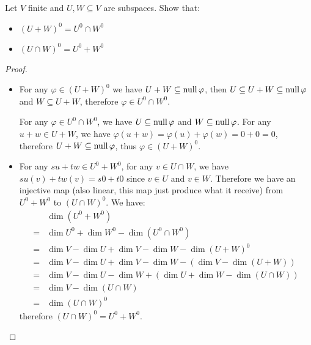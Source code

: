 \documentclass[../main.tex]{subfiles}
\begin{document}
\begin{exercise}
  Let $V$ finite and $U, W \subseteq V$ are subspaces. Show that:
  \begin{itemize}
    \item $(U + W)^0 = U^0 \cap W^0$
    \item $(U \cap W)^0 = U^0 + W^0$
  \end{itemize}
\end{exercise}
\begin{proof}
  ~
  \begin{itemize}
    \item For any $\varphi \in (U + W)^0$ we have $U + W \subseteq \operatorname{null} \varphi$, 
          then $U \subseteq U + W \subseteq \operatorname{null} \varphi$ and $W \subseteq U + W$,
          therefore $\varphi \in U^0 \cap W^0$.
          
          For any $\varphi \in U^0 \cap W^0$, we have $U \subseteq \operatorname{null} \varphi$ and $W \subseteq \operatorname{null} \varphi$.
          For any $u + w \in U + W$, we have $\varphi(u + w) = \varphi(u) + \varphi(w) = 0 + 0 = 0$,
          therefore $U + W \subseteq \operatorname{null} \varphi$, thus $\varphi \in (U + W)^0$.
    \item For any $su + tw \in U^0 + W^0$, for any $v \in U \cap W$, we have $su(v) + tw(v) = s0 + t0$
          since $v \in U$ and $v \in W$. Therefore we have an injective map (also linear, this map just produce what it receive)
          from $U^0 + W^0$ to $(U \cap W)^0$.
          We have:
          \begin{align*}
             & \dim (U^0 + W^0) \\
            =& \dim U^0 + \dim W^0  - \dim (U^0 \cap W^0) \\
            =& \dim V - \dim U + \dim V - \dim W - \dim (U + W)^0 \\
            =& \dim V - \dim U + \dim V - \dim W - (\dim V - \dim (U + W)) \\
            =& \dim V - \dim U - \dim W + (\dim U + \dim W - \dim (U \cap W)) \\
            =& \dim V - \dim (U \cap W) \\
            =& \dim (U \cap W)^0
          \end{align*}
          therefore $(U \cap W)^0 = U^0 + W^0$.
  \end{itemize}
\end{proof}
\end{document}
